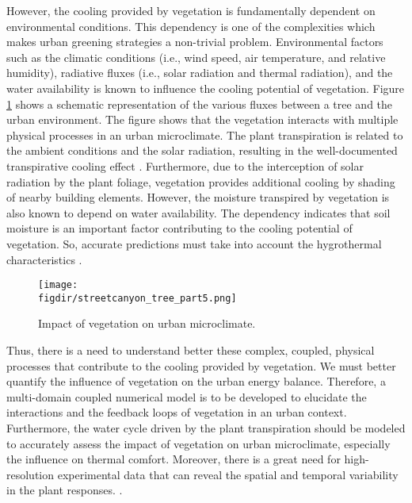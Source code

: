 However, the cooling provided by vegetation is fundamentally dependent on environmental conditions. This dependency is one of the complexities which makes urban greening strategies a non-trivial problem. Environmental factors such as the climatic conditions (i.e., wind speed, air temperature, and relative humidity), radiative fluxes (i.e., solar radiation and thermal radiation), and the water availability is known to influence the cooling potential of vegetation. Figure \ref{fig:vegetation_fluxes} shows a schematic representation of the various fluxes between a tree and the urban environment. The figure shows that the vegetation interacts with multiple physical processes in an urban microclimate. The plant transpiration is related to the ambient conditions and the solar radiation, resulting in the well-documented transpirative cooling effect \citep{Oke2017a,Farquhar2007,abtew2012evaporation,Melesse2008}. Furthermore, due to the interception of solar radiation by the plant foliage, vegetation provides additional cooling by shading of nearby building elements. However, the moisture transpired by vegetation is also known to depend on water availability. The dependency indicates that soil moisture is an important factor contributing to the cooling potential of vegetation. So, accurate predictions must take into account the hygrothermal characteristics .


\begin{figure}[t]
	\centering
	\texttt{[image: \\figdir/streetcanyon\_tree\_part5.png]}
	\caption{Impact of vegetation on urban microclimate.}
	\label{fig:vegetation_fluxes}
\end{figure}

Thus, there is a need to understand better these complex, coupled, physical processes that contribute to the cooling provided by vegetation. We must better quantify the influence of vegetation on the urban energy balance. Therefore, a multi-domain coupled numerical model is to be developed to elucidate the interactions and the feedback loops of vegetation in an urban context. Furthermore, the water cycle driven by the plant transpiration should be modeled to accurately assess the impact of vegetation on urban microclimate, especially the influence on thermal comfort. Moreover, there is a great need for high-resolution experimental data that can reveal the spatial and temporal variability in the plant responses. .

